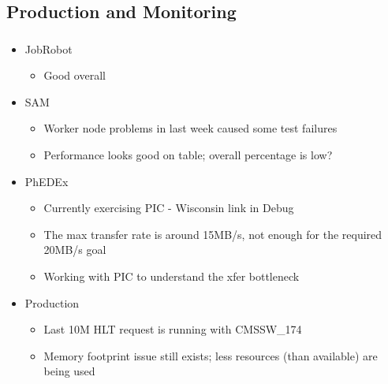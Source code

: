 \documentclass{beamer}
\begin{document}
\subsection{Production and Monitoring}
\begin{frame}
\frametitle{}
\begin{itemize}
    \item JobRobot
    \begin{itemize}
        \item Good overall
    \end{itemize}
    \item SAM
    \begin{itemize}
        \item Worker node problems in last week caused some test failures
        \item Performance looks good on table; overall percentage is low?
    \end{itemize}
    \item PhEDEx
    \begin{itemize}
        \item Currently exercising PIC - Wisconsin link in Debug
        \item The max transfer rate is around 15MB/s, not enough for the required 20MB/s goal
        \item Working with PIC to understand the xfer bottleneck
    \end{itemize}
    \item Production
    \begin{itemize}
        \item Last 10M HLT request is running with CMSSW\_174
        \item Memory footprint issue still exists; less resources (than available) are being used
    \end{itemize}
\end{itemize}
\end{frame}
\end{document}
